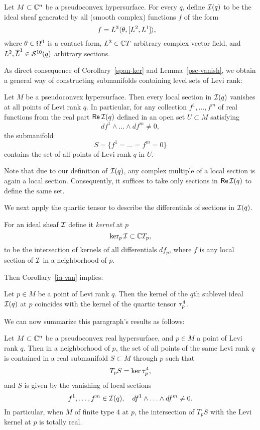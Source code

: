 \documentclass[12pt]{amsart}
\begin{document}
\bd
Let $M\subset{{\mathbb{C}}^n}$ be a pseudoconvex hypersurface.
For every $q$,
define ${\mathcal{I}}(q)$ to be the ideal sheaf 
generated by all (smooth complex) functions $f$ of the form
$$
	f = L^3 \langle \theta, [L^2, L^1] \rangle,
	\quad 
$$
where $\theta\in\Omega^0$ is a contact form, 
$L^3\in {\mathbb{C}} T$ arbitrary complex vector field,
and $L^2, \overline{L}^1 \in {\mathcal{S}}^{10}(q)$
arbitrary sections.
\ed

As direct consequence of Corollary~\ref{span-ker} and 
Lemma~\ref{psc-vanish}, we obtain
a general way of constructing submanifolds
containing level sets of Levi rank:

\bc{}
Let $M$ be a pseudoconvex hypersurface.
Then every local section in ${\mathcal{I}}(q)$
vanishes at all points of Levi rank $q$.
In particular, for any collection $f^1, \ldots, f^m$
of real functions from the real part ${\sf Re}\, {\mathcal{I}}(q)$
defined in an open set $U\subset M$
satisfying 
$$
	df^1 \wedge \ldots \wedge df^m\ne 0,
$$
the submanifold
$$
	S = \{ f^1 = \ldots = f^m =0 \}
$$
contains the set of all points of Levi rank $q$ in $U$.
\ec

\br
Note that due to our definition of ${\mathcal{I}}(q)$,
any complex multiple of a local section is again a local section.
Consequently, it suffices to take only sections in ${\sf Re}\, {\mathcal{I}}(q)$
to define the same set.
\er


We next apply the quartic tensor to describe the differentials
of sections in ${\mathcal{I}}(q)$.

\bd
For an ideal sheaf ${\mathcal{I}}$ define it {\em kernel} at $p$
$$
	\ker_p {\mathcal{I}} \subset {\mathbb{C}} T_p,
$$
to be the intersection of kernels of all differentials $df_p$,
where $f$ is any local section of ${\mathcal{I}}$ in a neighborhood of $p$.
\ed

Then Corollary~\ref{iq-van} implies:

\bl
Let $p\in M$ be a point of Levi rank $q$.
Then the kernel of the $q$th sublevel ideal ${\mathcal{I}}(q)$ at $p$
coincides with the kernel of the quartic tensor $\tau^4_p$.
\el

We can now summarize this paragraph's results as follows:

\bp{}
Let $M\subset{{\mathbb{C}}^n}$ be a pseudoconvex real hypersurface,
and $p\in M$ a point of Levi rank $q$.
Then in a neighborhood of $p$, 
the set 
 of all points of the same Levi rank $q$
is contained in a real submanifold $S\subset M$
through $p$ such that
$$
	T_p S = \ker \tau^4_p,
$$
and $S$ is given by the vanishing 
of local sections
$$
	f^1, \ldots, f^m \in {\mathcal{I}}(q),
	\quad
	df^1\wedge \ldots \wedge df^m \ne 0.
$$
%
In particular, when $M$ of finite type $4$ at $p$,
the intersection of $T_pS$
with the Levi kernel at $p$ is totally real.
\ep
\end{document}
